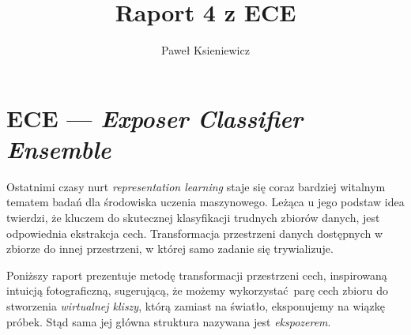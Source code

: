 \documentclass[]{article}
\title{Raport 4 z ECE}
\author{Paweł Ksieniewicz}
\begin{document}
\newenvironment{ride}[2]
{
	\caption{#2}
    \label{tab:results}
	\centering
	\begin{tabular}{lS>{\color{red}}S}
		\\\toprule{promień} & {accuracy} & {\textsc{bac}} \\\midrule
	    \csvreader[head to column names]{#1}{}%
	    {\radius & \accuracy & \bac\\}%
	\end{tabular}
	
	\begin{tikzpicture}
	\begin{axis}[
	    grid=both,
	    grid style={line width=.1pt, draw=gray!10},
	    major grid style={line width=.2pt,draw=gray!50},
	    width=6cm,
	    height=3cm,
	    xmin=0.01, xmax=0.29,
	    ymin=.55, ymax=1,
	    ytick = {.5, .6, .7, .8, .9, 1},
	    yticklabels = { ~, 60\%, ~, 80\%, ~, 100\%},
	    xtick = {0, .05, .1, 0.15, 0.2, 0.25},
		xticklabels = {~, 5,10,15,20,25},
		minor tick num=2,
		ticklabel style={font=\tiny,fill=white}		]
		\addplot[color=black] table [x=radius, y=accuracy, col sep=comma] {#1};
		\addplot[color=red] table [x=radius, y=bac, col sep=comma] {#1};
	\end{axis}
	\end{tikzpicture}
}{}

\maketitle
\newpage

\section{ECE --- \emph{Exposer Classifier Ensemble}}

Ostatnimi czasy nurt \emph{representation learning} staje się coraz bardziej witalnym tematem badań dla środowiska uczenia maszynowego. Leżąca u jego podstaw idea twierdzi, że kluczem do skutecznej klasyfikacji trudnych zbiorów danych, jest odpowiednia ekstrakcja cech. Transformacja przestrzeni danych dostępnych w zbiorze do innej przestrzeni, w której samo zadanie się trywializuje. 

Poniższy raport prezentuje metodę transformacji przestrzeni cech, inspirowaną intuicją fotograficzną, sugerującą, że możemy wykorzystać parę cech zbioru do stworzenia \emph{wirtualnej kliszy}, którą zamiast na światło, eksponujemy na wiązkę próbek. Stąd sama jej główna struktura nazywana jest \emph{ekspozerem}.
\end{document}
